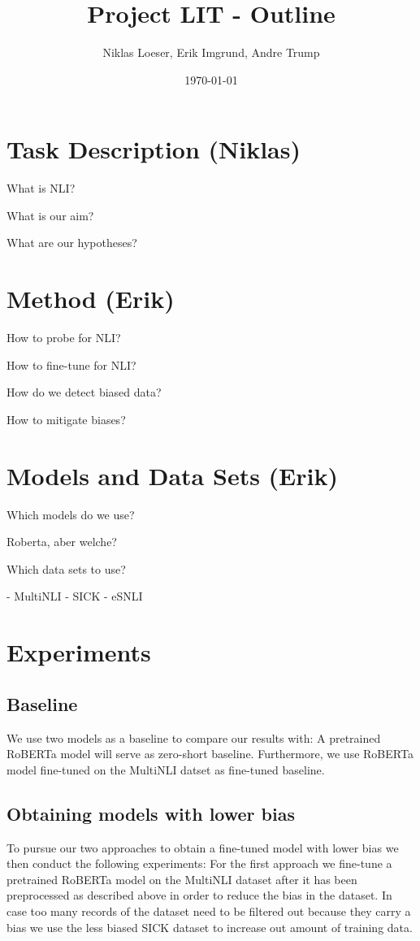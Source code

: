 \documentclass[12pt,a4paper]{article}
\title{Project LIT - Outline}
\author{Niklas Loeser, Erik Imgrund, Andre Trump}
\date{\today}
\begin{document}
\begin{acronym}
\end{acronym}

\maketitle

\section{Task Description (Niklas)}
What is NLI?

What is our aim?

What are our hypotheses?

\section{Method (Erik)}
How to probe for NLI?

How to fine-tune for NLI?

How do we detect biased data?

How to mitigate biases?

\section{Models and Data Sets (Erik)}
Which models do we use?

Roberta, aber welche?

Which data sets to use?

- MultiNLI
- SICK
- eSNLI

\section{Experiments}
\subsection{Baseline}
We use two models as a baseline to compare our results with: A pretrained RoBERTa model will serve as zero-short baseline. Furthermore, we use RoBERTa model fine-tuned on the MultiNLI datset as fine-tuned baseline.

\subsection{Obtaining models with lower bias}
To pursue our two approaches to obtain a fine-tuned model with lower bias we then conduct the following experiments: For the first approach we fine-tune a pretrained RoBERTa model on the MultiNLI dataset after it has been preprocessed as described above in order to reduce the bias in the dataset. In case too many records of the dataset need to be filtered out because they carry a bias we use the less biased SICK dataset to increase out amount of training data. 
\end{document}
